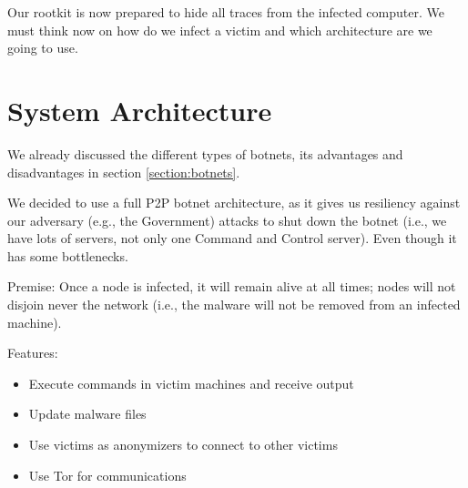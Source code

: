 \documentclass[11pt, a4paper,twoside]{tesi_upf}
\begin{document}
Our rootkit is now prepared to hide all traces from the infected computer. We must think now on how do we infect a victim and which architecture are we going to use.

\section{System Architecture}

We already discussed the different types of botnets, its advantages and disadvantages in section \ref{section:botnets}.

We decided to use a full P2P botnet architecture, as it gives us resiliency against our adversary (e.g., the Government) attacks to shut down the botnet (i.e., we have lots of servers, not only one Command and Control server). Even though it has some bottlenecks.

Premise:
Once a node is infected, it will remain alive at all times; nodes will not disjoin never the network (i.e., the malware will not be removed from an infected machine).

Features:
\begin{itemize}
    \item Execute commands in victim machines and receive output
    \item Update malware files
    \item Use victims as anonymizers to connect to other victims
    \item Use Tor for communications
\end{itemize}
\end{document}
